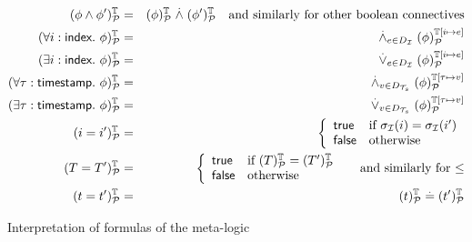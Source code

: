 \begin{figure}[t]
  \begin{eqnarray*}
    (\phi\wedge\phi')^{\mathbb{T}}_{\mathcal{P}} &=& (\phi)^{\mathbb{T}}_{\mathcal{P}}
    \stackrel{.}{\wedge} (\phi')^{\mathbb{T}}_{\mathcal{P}}
    \quad \text{and similarly for other boolean connectives} \\
    (\forall i:\textsf{index}.~ \phi)^{\mathbb{T}}_{\mathcal{P}} &=&
    \stackrel{.}{\wedge}_{e\in D_{\mathcal{I}}} (\phi)^{\mathbb{T}[i\mapsto e]}_{\mathcal{P}} \\
    (\exists i:\textsf{index}.~ \phi)^{\mathbb{T}}_{\mathcal{P}} &=&
    \stackrel{.}{\vee}_{e\in D_{\mathcal{I}}} (\phi)^{\mathbb{T}[i\mapsto e]}_{\mathcal{P}} \\
    (\forall \tau:\textsf{timestamp}.~ \phi)^{\mathbb{T}}_{\mathcal{P}} &=&
    \stackrel{.}{\wedge}_{v\in D_{\mathcal{T}_s}} (\phi)^{\mathbb{T}[\tau\mapsto v]}_{\mathcal{P}} \\
    (\exists \tau:\textsf{timestamp}.~ \phi)^{\mathbb{T}}_{\mathcal{P}} &=&
    \stackrel{.}{\vee}_{v\in D_{\mathcal{T}_s}} (\phi)^{\mathbb{T}[\tau\mapsto v]}_{\mathcal{P}} \\
    (i=i')^{\mathbb{T}}_{\mathcal{P}} &=&
    \left\{\begin{array}{ll}
      \mathsf{true} & \text{if } \sigma_{\mathcal{I}}(i)=\sigma_{\mathcal{I}}(i') \\
      \mathsf{false} & \text{otherwise}
    \end{array}\right. \\
    (T = T')^{\mathbb{T}}_{\mathcal{P}} &=&
    \left\{\begin{array}{ll}
      \mathsf{true} & \text{if } (T)^{\mathbb{T}}_{\mathcal{P}} = (T')^{\mathbb{T}}_{\mathcal{P}} \\
      \mathsf{false} & \text{otherwise}
    \end{array}\right.
    \quad\text{ and similarly for $\leq$} \\
    (t=t')^{\mathbb{T}}_{\mathcal{P}} &=& (t)^{\mathbb{T}}_{\mathcal{P}} \stackrel{.}{=} (t')^{\mathbb{T}}_{\mathcal{P}}
  \end{eqnarray*}
  \caption{Interpretation of formulas of the meta-logic}
  \label{fig:interpf}
\end{figure}


